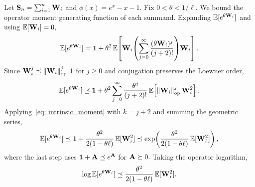 \documentclass[mnsc]{informs3aa} %
\newcommand{\norm}[1]{\left\|#1\right\|}
\newcommand{\idty}{\mathbf{1}}
\newcommand{\op}{\mathrm{op}}
\begin{document}
 Let $\bold{S}_n=\sum_{i=1}^n \bold{W}_i$ and $\phi(x)=e^x-x-1.$ Fix $0<\theta<1/\ell.$ We bound the operator moment generating function of each summand. Expanding $\mathbb{E}[e^{\theta \bold{W}_i}]$ and using $\mathbb{E}[\bold{W}_i]=0,$
\[\mathbb{E}[e^{\theta \bold{W}_i}]=\idty+\theta^2\,\mathbb{E}\!\left[\bold{W}_i\!\left(\sum_{j=0}^{\infty}\frac{(\theta \bold{W}_i)^j}{(j+2)!}\right)\!\bold{W}_i\right].\]
Since $\bold{W}_i^j\preceq\norm{\bold{W}_i}_{\op}^j\,\idty$ for $j\geq 0$ and conjugation preserves the Loewner order,
\[\mathbb{E}[e^{\theta \bold{W}_i}]\preceq\idty+\theta^2\sum_{j=0}^{\infty}\frac{\theta^j}{(j+2)!}\,\mathbb{E}\!\left[\norm{\bold{W}_i}_{\op}^j \bold{W}_i^2\right].\]
Applying~\eqref{eq: intrinsic_moment} with $k=j+2$ and summing the geometric series,
\begin{equation}\label{eq: mgf_bound}
\mathbb{E}[e^{\theta \bold{W}_i}]\preceq\idty+\frac{\theta^2}{2(1-\theta \ell)}\,\mathbb{E}[\bold{W}_i^2]\preceq\exp\!\left(\frac{\theta^2}{2(1-\theta \ell)}\,\mathbb{E}[\bold{W}_i^2]\right),
\end{equation}
where the last step uses $\idty+\bold{A}\preceq e^{\bold{A}}$ for $\bold{A}\succeq 0.$ Taking the operator logarithm,
\begin{equation}\label{eq: log_mgf}
\log\mathbb{E}[e^{\theta \bold{W}_i}]\preceq\frac{\theta^2}{2(1-\theta \ell)}\,\mathbb{E}[\bold{W}_i^2].
\end{equation}
\end{document}
